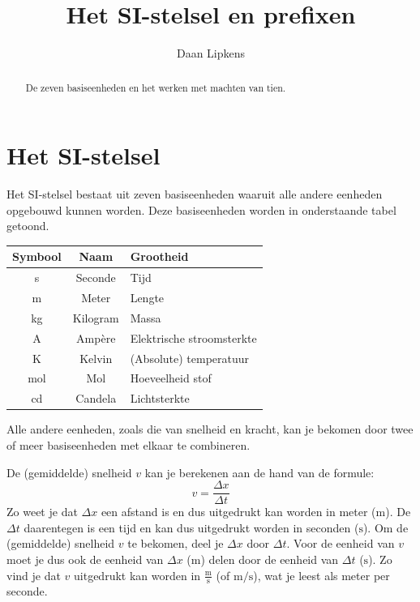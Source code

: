 \documentclass{ximera}
\title{Het SI-stelsel en prefixen}
\author{Daan Lipkens}
\begin{document}
\begin{abstract}
    De zeven basiseenheden en het werken met machten van tien.
\end{abstract}
\maketitle

\section{Het SI-stelsel}
Het SI-stelsel bestaat uit zeven basiseenheden waaruit alle andere eenheden opgebouwd kunnen worden. Deze basiseenheden worden in onderstaande tabel getoond.

\begin{center}
    \begin{tabular}{ |c|c|l| } 
    \hline
    \textbf{Symbool} & \textbf{Naam} & \textbf{Grootheid} \\
    \hline
    s & Seconde & Tijd \\
    \hline
    m & Meter & Lengte \\
    \hline
    kg & Kilogram & Massa \\
    \hline
    A & Ampère & Elektrische stroomsterkte \\
    \hline
    K & Kelvin & (Absolute) temperatuur \\
    \hline
    mol & Mol & Hoeveelheid stof \\
    \hline
    cd & Candela & Lichtsterkte \\
    \hline
    \end{tabular}
\end{center}

Alle andere eenheden, zoals die van snelheid en kracht, kan je bekomen door twee of meer basiseenheden met elkaar te combineren.

\begin{example}[title={Gemiddelde snelheid}]\nl
    De (gemiddelde) snelheid $v$ kan je berekenen aan de hand van de formule:
    \[ v = \frac{\Delta x}{\Delta t} \]
    Zo weet je dat $\Delta x$ een afstand is en dus uitgedrukt kan worden in meter ($\mathrm{m}$). De $\Delta t$ daarentegen is een tijd en kan dus uitgedrukt worden in seconden ($\mathrm{s}$). Om de (gemiddelde) snelheid $v$ te bekomen, deel je $\Delta x$ door $\Delta t$. Voor de eenheid van $v$ moet je dus ook de eenheid van $\Delta x$ ($\mathrm{m}$) delen door de eenheid van $\Delta t$ ($\mathrm{s}$). Zo vind je dat $v$ uitgedrukt kan worden in $\mathrm{\frac{m}{s}}$ (of $\mathrm{m/s}$), wat je leest als meter per seconde.
\end{example}
\end{document}
